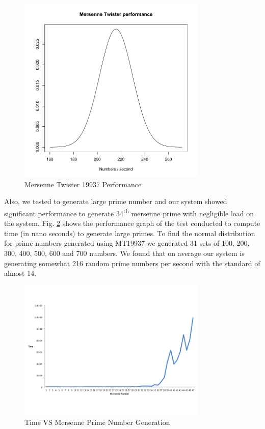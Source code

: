 \documentclass[conference]{IEEEtran}
\begin{document}
\begin{figure}[ht!]
\centering
\includegraphics[width=90mm]{images/Rplot.pdf}
\caption{Mersenne Twister 19937 Performance}
\label{fig:mersenne_performance}
\end{figure}

Also, we tested to generate large prime number and our system showed significant performance to generate 34\textsuperscript{th} mersenne prime with negligible load on the system. Fig. \ref{fig:mersenne_time} shows the performance graph of the test conducted to compute time (in nano seconds) to generate large primes. To find the normal distribution for prime numbers generated using MT19937 we generated 31 sets of 100, 200, 300, 400, 500, 600 and 700 numbers. We found that on average our system is generating somewhat 216 random prime numbers per second with the standard of almost 14.

\begin{figure}[ht!]
\centering
\includegraphics[width=90mm]{images/mersenneTime.png}
\caption{Time VS Mersenne Prime Number Generation}
\label{fig:mersenne_time}
\end{figure}
\end{document}
